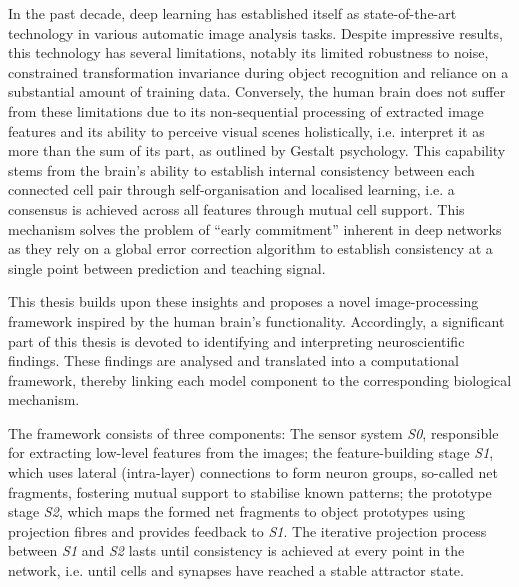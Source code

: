 In the past decade, deep learning has established itself as state-of-the-art technology in various automatic image analysis tasks.
Despite impressive results, this technology has several limitations, notably its limited robustness to noise, constrained transformation invariance during object recognition and reliance on a substantial amount of training data.
Conversely, the human brain does not suffer from these limitations due to its non-sequential processing of extracted image features and its ability to perceive visual scenes holistically, i.e. interpret it as more than the sum of its part, as outlined by Gestalt psychology.
This capability stems from the brain's ability to establish internal consistency between each connected cell pair through self-organisation and localised learning, i.e. a consensus is achieved across all features through mutual cell support. This mechanism solves the problem of ``early commitment'' inherent in deep networks as they rely on a global error correction algorithm to establish consistency at a single point between prediction and teaching signal.

This thesis builds upon these insights and proposes a novel image-processing framework inspired by the human brain's functionality.
Accordingly, a significant part of this thesis is devoted to identifying and interpreting neuroscientific findings.
These findings are analysed and translated into a computational framework, thereby linking each model component to the corresponding biological mechanism.

The framework consists of three components: The sensor system \emph{S0},  responsible for extracting low-level features from the images; the feature-building stage \emph{S1}, which uses lateral (intra-layer) connections to form neuron groups, so-called net fragments,  fostering mutual support to stabilise known patterns; the prototype stage \emph{S2}, which maps the formed net fragments to object prototypes using projection fibres and provides feedback to \emph{S1}.
The iterative projection process between \emph{S1} and \emph{S2} lasts until consistency is achieved at every point in the network, i.e. until cells and synapses have reached a stable attractor state.

